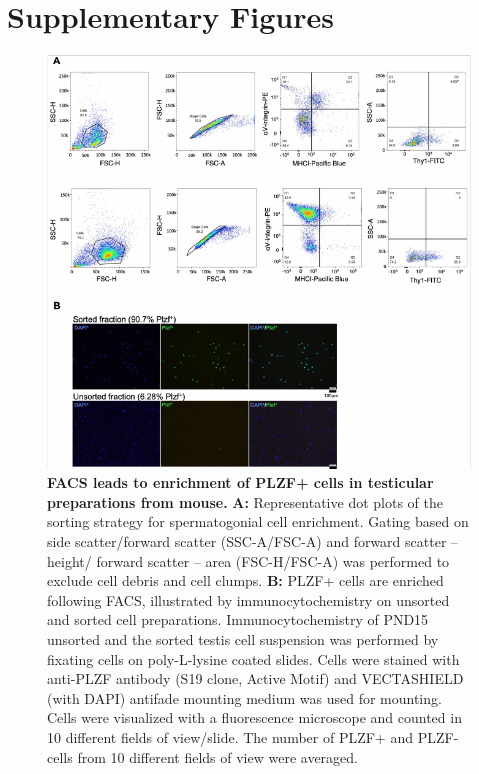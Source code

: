 \documentclass[12pt,twoside]{reedthesis}
\begin{document}
\hypertarget{supplementary-figures}{%
\section{Supplementary Figures}\label{supplementary-figures}}
\begin{subfigures}


\begin{figure}[H]

{\centering \includegraphics{thesis_files/figure-latex/ds1a-1} 

}

\caption[FACS leads to enrichment of PLZF+ cells in testicular preparations from mouse]{\textbf{FACS leads to enrichment of PLZF+ cells in testicular preparations from mouse.} \newline \textbf{A:} Representative dot plots of the sorting strategy for spermatogonial cell enrichment. Gating based on side scatter/forward scatter (SSC-A/FSC-A) and forward scatter – height/ forward scatter – area (FSC-H/FSC-A) was performed to exclude cell debris and cell clumps. \newline \textbf{B:} PLZF+ cells are enriched following FACS, illustrated by immunocytochemistry on unsorted and sorted cell preparations. Immunocytochemistry of PND15 unsorted and the sorted testis cell suspension was performed by fixating cells on poly-L-lysine coated slides. Cells were stained with anti-PLZF antibody (S19 clone, Active Motif) and VECTASHIELD (with DAPI) antifade mounting medium was used for mounting. Cells were visualized with a fluorescence microscope and counted in 10 different fields of view/slide. The number of PLZF+ and PLZF- cells from 10 different fields of view were averaged.}\label{fig:ds1a}
\end{figure}


\end{subfigures}
\end{document}
